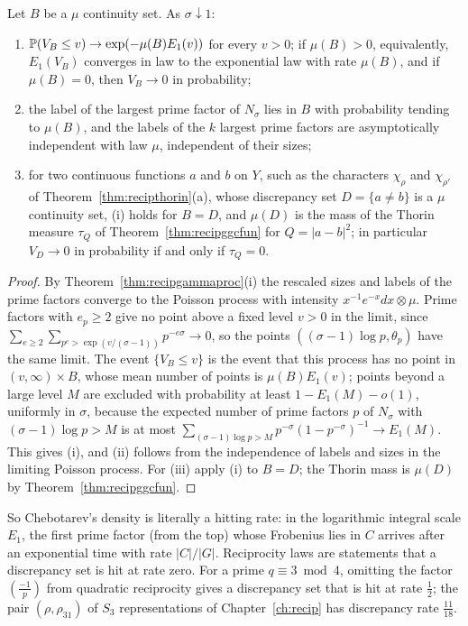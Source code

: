 \begin{theorem}\label{thm:hitrate}
Let $B$ be a $\mu$ continuity set. As $\sigma\downarrow1$:
\begin{enumerate}
\item[(i)] $\mathbb{P}(V_B\le v)\to\exp(-\mu(B)E_1(v))$ for every $v>0$; if $\mu(B)>0$, equivalently, $E_1(V_B)$ converges in law to the exponential law with rate $\mu(B)$, and if $\mu(B)=0$, then $V_B\to0$ in probability;
\item[(ii)] the label of the largest prime factor of $N_\sigma$ lies in $B$ with probability tending to $\mu(B)$, and the labels of the $k$ largest prime factors are asymptotically independent with law $\mu$, independent of their sizes;
\item[(iii)] for two continuous functions $a$ and $b$ on $Y$, such as the characters $\chi_\rho$ and $\chi_{\rho'}$ of Theorem~\ref{thm:recipthorin}(a), whose discrepancy set $D=\{a\ne b\}$ is a $\mu$ continuity set, (i) holds for $B=D$, and $\mu(D)$ is the mass of the Thorin measure $\tau_Q$ of Theorem~\ref{thm:recipggcfun} for $Q=|a-b|^2$; in particular $V_D\to0$ in probability if and only if $\tau_Q=0$.
\end{enumerate}
\end{theorem}

\begin{proof}
By Theorem~\ref{thm:recipgammaproc}(i) the rescaled sizes and labels of the prime factors converge to the Poisson process with intensity $x^{-1}e^{-x}dx\otimes\mu$. Prime factors with $e_p\ge2$ give no point above a fixed level $v>0$ in the limit, since $\sum_{e\ge2}\sum_{p^e>\exp(v/(\sigma-1))}p^{-e\sigma}\to0$, so the points $((\sigma-1)\log p,\theta_p)$ have the same limit. The event $\{V_B\le v\}$ is the event that this process has no point in $(v,\infty)\times B$, whose mean number of points is $\mu(B)E_1(v)$; points beyond a large level $M$ are excluded with probability at least $1-E_1(M)-o(1)$, uniformly in $\sigma$, because the expected number of prime factors $p$ of $N_\sigma$ with $(\sigma-1)\log p>M$ is at most $\sum_{(\sigma-1)\log p>M}p^{-\sigma}(1-p^{-\sigma})^{-1}\to E_1(M)$. This gives (i), and (ii) follows from the independence of labels and sizes in the limiting Poisson process. For (iii) apply (i) to $B=D$; the Thorin mass is $\mu(D)$ by Theorem~\ref{thm:recipggcfun}.
\end{proof}

So Chebotarev's density is literally a hitting rate: in the logarithmic integral scale $E_1$, the first prime factor (from the top) whose Frobenius lies in $C$ arrives after an exponential time with rate $|C|/|G|$. Reciprocity laws are statements that a discrepancy set is hit at rate zero. For a prime $q\equiv3\bmod4$, omitting the factor $(\frac{-1}p)$ from quadratic reciprocity gives a discrepancy set that is hit at rate $\frac12$; the pair $(\rho,\rho_{31})$ of $S_3$ representations of Chapter~\ref{ch:recip} has discrepancy rate $\frac{11}{18}$.


